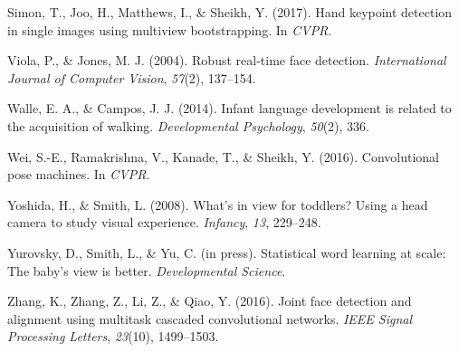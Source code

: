\documentclass[10pt, letterpaper]{article}
\begin{document}
\hypertarget{ref-simon2017hand}{}
Simon, T., Joo, H., Matthews, I., \& Sheikh, Y. (2017). Hand keypoint
detection in single images using multiview bootstrapping. In
\emph{CVPR}.

\hypertarget{ref-viola2004robust}{}
Viola, P., \& Jones, M. J. (2004). Robust real-time face detection.
\emph{International Journal of Computer Vision}, \emph{57}(2), 137--154.

\hypertarget{ref-walle2014}{}
Walle, E. A., \& Campos, J. J. (2014). Infant language development is
related to the acquisition of walking. \emph{Developmental Psychology},
\emph{50}(2), 336.

\hypertarget{ref-wei2016cpm}{}
Wei, S.-E., Ramakrishna, V., Kanade, T., \& Sheikh, Y. (2016).
Convolutional pose machines. In \emph{CVPR}.

\hypertarget{ref-yoshida2008}{}
Yoshida, H., \& Smith, L. (2008). What's in view for toddlers? Using a
head camera to study visual experience. \emph{Infancy}, \emph{13},
229--248.

\hypertarget{ref-yurovsky2012}{}
Yurovsky, D., Smith, L., \& Yu, C. (in press). Statistical word learning
at scale: The baby's view is better. \emph{Developmental Science}.

\hypertarget{ref-zhang2016}{}
Zhang, K., Zhang, Z., Li, Z., \& Qiao, Y. (2016). Joint face detection
and alignment using multitask cascaded convolutional networks.
\emph{IEEE Signal Processing Letters}, \emph{23}(10), 1499--1503.
\end{document}
